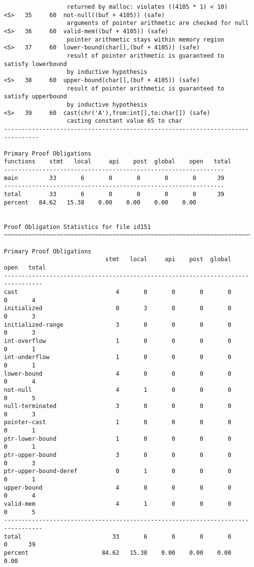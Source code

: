 \documentclass[11pt]{article}
\begin{document}
\begin{scriptsize}
\begin{verbatim}
                  returned by malloc: violates ((4105 * 1) < 10)
<S>   35     60  not-null((buf + 4105)) (safe)
                  arguments of pointer arithmetic are checked for null
<S>   36     60  valid-mem((buf + 4105)) (safe)
                  pointer arithmetic stays within memory region
<S>   37     60  lower-bound(char[],(buf + 4105)) (safe)
                  result of pointer arithmetic is guaranteed to satisfy lowerbound 
                  by inductive hypothesis
<S>   38     60  upper-bound(char[],(buf + 4105)) (safe)
                  result of pointer arithmetic is guaranteed to satisfy upperbound 
                  by inductive hypothesis
<S>   39     60  cast(chr('A'),from:int[],to:char[]) (safe)
                  casting constant value 65 to char
--------------------------------------------------------------------------------

Primary Proof Obligations
functions    stmt   local     api    post  global    open   total
---------------------------------------------------------------
main         33       6       0       0       0       0      39
---------------------------------------------------------------
total        33       6       0       0       0       0      39
percent   84.62   15.38    0.00    0.00    0.00    0.00


Proof Obligation Statistics for file id151
~~~~~~~~~~~~~~~~~~~~~~~~~~~~~~~~~~~~~~~~~~~~~~~~~~~~~~~~~~~~~~~~~~~~~~~~~~~~~~~~

Primary Proof Obligations
                             stmt   local     api    post  global    open   total
---------------------------------------------------------------------------------
cast                            4       0       0       0       0       0       4
initialized                     0       3       0       0       0       0       3
initialized-range               3       0       0       0       0       0       3
int-overflow                    1       0       0       0       0       0       1
int-underflow                   1       0       0       0       0       0       1
lower-bound                     4       0       0       0       0       0       4
not-null                        4       1       0       0       0       0       5
null-terminated                 3       0       0       0       0       0       3
pointer-cast                    1       0       0       0       0       0       1
ptr-lower-bound                 1       0       0       0       0       0       1
ptr-upper-bound                 3       0       0       0       0       0       3
ptr-upper-bound-deref           0       1       0       0       0       0       1
upper-bound                     4       0       0       0       0       0       4
valid-mem                       4       1       0       0       0       0       5
---------------------------------------------------------------------------------
total                          33       6       0       0       0       0      39
percent                     84.62   15.38    0.00    0.00    0.00    0.00
\end{verbatim}
\end{scriptsize}
\end{document}
